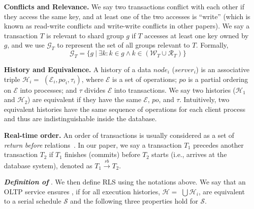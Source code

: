 \vspace{2pt}
\noindent\textbf{Conflicts and Relevance.}
We say two transactions conflict with each other if they access the same key, and at least one of the two accesses is ``write'' (which is known as read-write conflicts and write-write conflicts in other papers). We say a transaction $T$ is relevant to shard group $g$ if $T$ accesses at least one key owned by $g$, and we use $\mathcal{G}_T$ to represent the set of all groups relevant to $T$. Formally, $$\mathcal{G}_T = \{g\ |\ \exists k: k \in g \land k \in (\mathcal{W}_T \cup \mathcal{R}_T)\}$$

\vspace{2pt}
\noindent\textbf{History and Equivalence.} A history of a data $node_i$ ($server_i$) is an associative triple $\mathcal{H}_i =$ $(\mathcal{E}_i, {po}_{i}, {\tau}_i)$, where $\mathcal{E}$ is a set of operations; $po$ is a partial ordering on $\mathcal{E}$ into processes; and $\tau$ divides $\mathcal{E}$ into transactions. We say two histories ($\mathcal{H}_1$ and $\mathcal{H}_2$) are equivalent if they have the same $\mathcal{E}$, $po$, and $\tau$. Intuitively, two equivalent histories have the same sequence of operations for each client process and thus are indistinguishable inside the database. 

\vspace{2pt}
\noindent\textbf{Real-time order.} An order of transactions is usually considered as a set of \textit{return before} relations~\cite{lamport2019time}. In our paper, we say a transaction $T_1$ precedes another transaction $T_2$ if $T_1$ finishes (commits) before $T_2$ starts (i.e., arrives at the database system), denoted as $T_1 \xrightarrow{rb} T_2$.

\vspace{5pt}

\noindent\textbf{\textit{Definition of \xxcons}}. We then define RLS using the notations above. We say that an OLTP service ensures \xxcons, if for all execution histories, $\mathcal{H} =$ $\bigcup \mathcal{H}_i$, are equivalent to a serial schedule $\mathcal{S}$ and the following three properties hold for $\mathcal{S}$.



